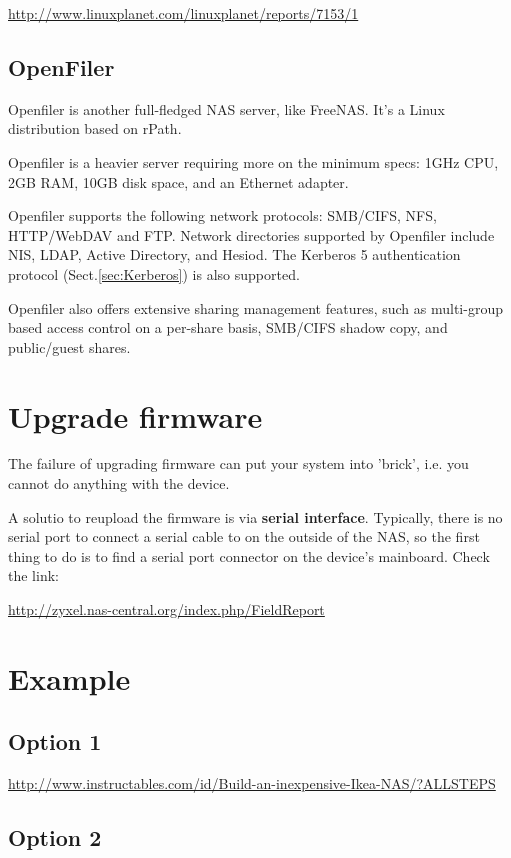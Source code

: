 \url{http://www.linuxplanet.com/linuxplanet/reports/7153/1}

\subsection{OpenFiler}
\label{sec:OpenFiler_OS-for-NAS}

Openfiler is another full-fledged NAS server, like FreeNAS. It's a Linux
distribution based on rPath. 

Openfiler is a heavier server requiring more on the minimum specs: 1GHz CPU, 2GB
RAM, 10GB disk space, and an Ethernet adapter.

Openfiler supports the following network protocols: SMB/CIFS, NFS, HTTP/WebDAV
and FTP. Network directories supported by Openfiler include NIS, LDAP, Active
Directory, and Hesiod. The Kerberos 5 authentication protocol
(Sect.\ref{sec:Kerberos}) is also supported.


Openfiler also offers extensive sharing management features, such as multi-group based access control on a per-share basis, SMB/CIFS shadow copy, and public/guest shares.


\section{Upgrade firmware}


The failure of upgrading firmware can put your system into 'brick', i.e. 
you cannot do anything with the device.

A solutio to reupload the firmware is via {\bf serial interface}.
Typically,  there is no serial port to connect a serial cable to on the outside
of the NAS, so the first thing to do is to find a serial port connector on the
device's mainboard. Check the link:

\url{http://zyxel.nas-central.org/index.php/FieldReport}


\section{Example}

\subsection{Option 1}

\url{http://www.instructables.com/id/Build-an-inexpensive-Ikea-NAS/?ALLSTEPS}

\subsection{Option 2}

